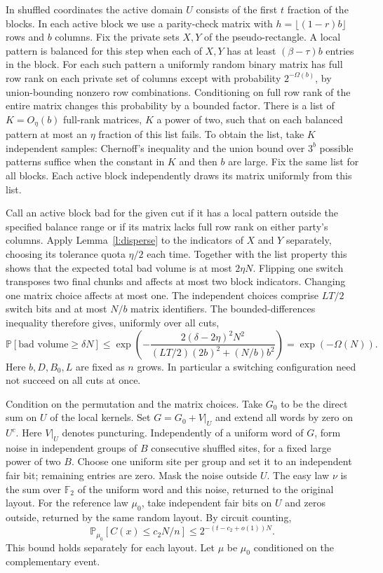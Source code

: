 \documentclass[11pt]{article}
\newcommand{\F}{\mathbb F_2}
\newcommand{\prob}{\mathbb P}
\begin{document}
In shuffled coordinates the active domain $U$ consists of the first $t$ fraction of the blocks. In each active block we use a parity-check matrix with $h=\lfloor(1-r)b\rfloor$ rows and $b$ columns. Fix the private sets $X,Y$ of the pseudo-rectangle. A local pattern is balanced for this step when each of $X,Y$ has at least $(\beta-\tau)b$ entries in the block. For each such pattern a uniformly random binary matrix has full row rank on each private set of columns except with probability $2^{-\Omega(b)}$, by union-bounding nonzero row combinations. Conditioning on full row rank of the entire matrix changes this probability by a bounded factor. There is a list of $K=O_\eta(b)$ full-rank matrices, $K$ a power of two, such that on each balanced pattern at most an $\eta$ fraction of this list fails. To obtain the list, take $K$ independent samples: Chernoff's inequality and the union bound over $3^b$ possible patterns suffice when the constant in $K$ and then $b$ are large. Fix the same list for all blocks. Each active block independently draws its matrix uniformly from this list.

Call an active block bad for the given cut if it has a local pattern outside the specified balance range or if its matrix lacks full row rank on either party's columns. Apply Lemma~\ref{l:disperse} to the indicators of $X$ and $Y$ separately, choosing its tolerance quota $\eta/2$ each time. Together with the list property this shows that the expected total bad volume is at most $2\eta N$. Flipping one switch transposes two final chunks and affects at most two block indicators. Changing one matrix choice affects at most one. The independent choices comprise $LT/2$ switch bits and at most $N/b$ matrix identifiers. The bounded-differences inequality therefore gives, uniformly over all cuts,
\begin{equation}\label{eq:bad}
 \prob[\text{bad volume}\ge\delta N]\le
 \exp\!\left(-\frac{2(\delta-2\eta)^2N^2}{(LT/2)(2b)^2+(N/b)b^2}\right)
 =\exp(-\Omega(N)).
\end{equation}
Here $b,D,B_0,L$ are fixed as $n$ grows. In particular a switching configuration need not succeed on all cuts at once.

Condition on the permutation and the matrix choices. Take $G_0$ to be the direct sum on $U$ of the local kernels. Set $G=G_0+V|_U$ and extend all words by zero on $U^c$. Here $V|_U$ denotes puncturing. Independently of a uniform word of $G$, form noise in independent groups of $B$ consecutive shuffled sites, for a fixed large power of two $B$. Choose one uniform site per group and set it to an independent fair bit; remaining entries are zero. Mask the noise outside $U$. The easy law $\nu$ is the sum over $\F$ of the uniform word and this noise, returned to the original layout. For the reference law $\mu_0$, take independent fair bits on $U$ and zeros outside, returned by the same random layout. By circuit counting,
\[
 \prob_{\mu_0}[C(x)\le c_2N/n]\le2^{-(t-c_2+o(1))N}.
\]
This bound holds separately for each layout. Let $\mu$ be $\mu_0$ conditioned on the complementary event.
\end{document}
